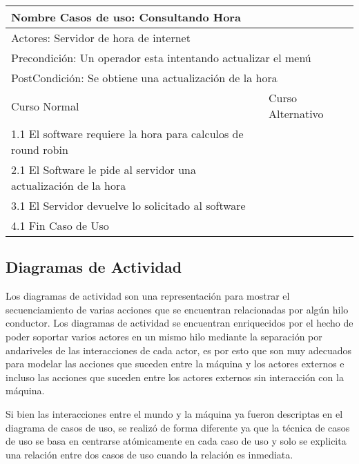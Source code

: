 \documentclass[a4paper,10pt]{article}
\begin{document}
\bigskip

\begin{center}
\begin{tabularx}{14cm}{|X|X|}
\hline
\multicolumn{2}{|l|}{Nombre Casos de uso: Consultando Hora}\\
\hline
\multicolumn{2}{|l|}{Actores: Servidor de hora de internet}\\
\hline
\multicolumn{2}{|l|}{Precondici\'on: Un operador esta intentando actualizar el men\'u}\\
\hline
\multicolumn{2}{|l|}{PostCondici\'on: Se obtiene una actualizaci\'on de la hora}\\
\hline
Curso Normal & Curso Alternativo\\
\hline
1.1 El software requiere la hora para calculos de round robin & 
\\
\hline
2.1 El Software le pide al servidor una actualizaci\'on de la hora & 
\\
\hline
3.1 El Servidor devuelve lo solicitado al software &
\\
\hline
4.1 Fin Caso de Uso &
\\
\hline
\end{tabularx}
\end{center}

\newpage

\subsection*{Diagramas de Actividad}


Los diagramas de actividad son una representaci\'on para mostrar el secuenciamiento de varias acciones que se encuentran relacionadas por alg\'un
hilo conductor. Los diagramas de actividad se encuentran enriquecidos por el hecho de poder soportar varios actores en un mismo hilo mediante la 
separaci\'on por andariveles de las interacciones de cada actor, es por esto que son muy adecuados para modelar las acciones que suceden entre la
m\'aquina y los actores externos e incluso las acciones que suceden entre los actores externos sin interacci\'on con la m\'aquina.

Si bien las interacciones entre el mundo y la m\'aquina ya fueron descriptas en el diagrama de casos de uso, se realiz\'o de forma diferente
ya que la t\'ecnica de casos de uso se basa en centrarse at\'omicamente en cada caso de uso y solo se explicita una relaci\'on entre dos casos de
uso cuando la relaci\'on es inmediata.
\end{document}
